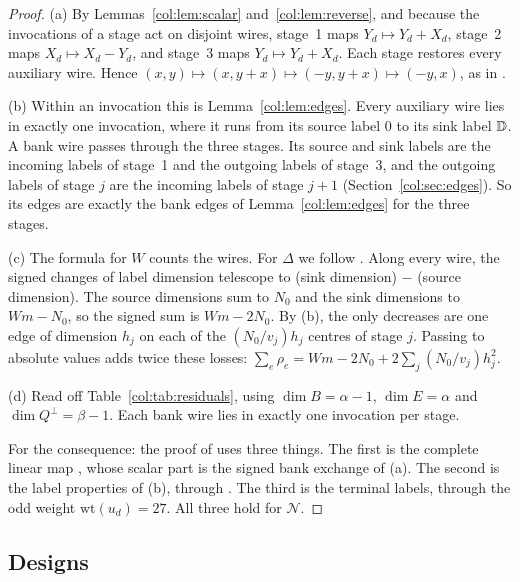 \begin{proof}
(a) By Lemmas~\ref{col:lem:scalar} and~\ref{col:lem:reverse}, and because the invocations of a stage act
on disjoint wires, stage~1 maps $Y_d\mapsto Y_d+X_d$, stage~2 maps $X_d\mapsto X_d-Y_d$, and stage~3
maps $Y_d\mapsto Y_d+X_d$. Each stage restores every auxiliary wire. Hence
$(x,y)\mapsto(x,y+x)\mapsto(-y,y+x)\mapsto(-y,x)$, as in \cite[Lemma~2.1]{oai}.

(b) Within an invocation this is Lemma~\ref{col:lem:edges}. Every auxiliary wire lies in exactly one
invocation, where it runs from its source label $0$ to its sink label $\mathbb{D}$. A bank wire passes through
the three stages. Its source and sink labels are the incoming labels of stage~1 and the outgoing labels
of stage~3, and the outgoing labels of stage $j$ are the incoming labels of stage $j+1$
(Section~\ref{col:sec:edges}). So its edges are exactly the bank edges of Lemma~\ref{col:lem:edges} for
the three stages.

(c) The formula for $W$ counts the wires. For $\Delta$ we follow \cite[proof of Lemma~2.3]{oai}. Along
every wire, the signed changes of label dimension telescope to (sink dimension) $-$ (source dimension).
The source dimensions sum to $N_0$ and the sink dimensions to $Wm-N_0$, so the signed sum is
$Wm-2N_0$. By (b), the only decreases are one edge of dimension $h_j$ on each of the
$(N_0/v_j)h_j$ centres of stage $j$. Passing to absolute values adds twice these losses:
$\sum_e\rho_e=Wm-2N_0+2\sum_j(N_0/v_j)h_j^2$.

(d) Read off Table~\ref{col:tab:residuals}, using $\dim B=\alpha-1$, $\dim E=\alpha$ and
$\dim Q^\perp=\beta-1$. Each bank wire lies in exactly one invocation per stage.

For the consequence: the proof of \cite[Proposition~2.4]{oai} uses three things. The first is the
complete linear map \cite[(2.6)]{oai}, whose scalar part is the signed bank exchange of (a). The second
is the label properties of (b), through \cite[Lemma~2.2]{oai}. The third is the terminal labels, through
the odd weight $\mathrm{wt}(u_d)=27$. All three hold for $\mathcal N$.
\end{proof}

\subsection{Designs}\label{col:sec:designs}

